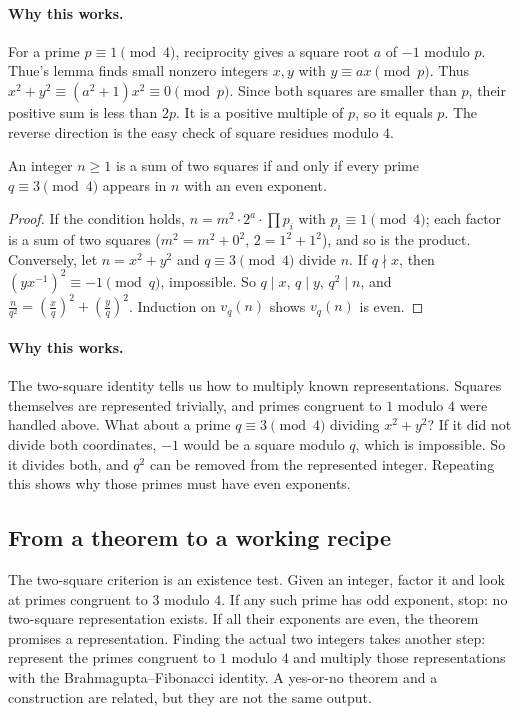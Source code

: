 \paragraph{Why this works.}
For a prime $p\equiv1\pmod4$, reciprocity gives a square root $a$ of $-1$ modulo $p$. Thue's lemma finds small nonzero integers $x,y$ with $y\equiv ax\pmod p$. Thus $x^2+y^2\equiv(a^2+1)x^2\equiv0\pmod p$. Since both squares are smaller than $p$, their positive sum is less than $2p$. It is a positive multiple of $p$, so it equals $p$. The reverse direction is the easy check of square residues modulo $4$.

\begin{theorem}\label{thm:twosqn}
An integer $n\ge1$ is a sum of two squares if and only if every prime $q\equiv3\pmod4$ appears in $n$ with an even exponent.
\end{theorem}
\begin{proof}
If the condition holds, $n=m^2\cdot2^a\cdot\prod p_i$ with $p_i\equiv1\pmod4$; each factor is a sum of two squares ($m^2=m^2+0^2$, $2=1^2+1^2$), and so is the product. Conversely, let $n=x^2+y^2$ and $q\equiv3\pmod4$ divide $n$. If $q\nmid x$, then $\left(yx^{-1}\right)^2\equiv-1\pmod q$, impossible. So $q\mid x$, $q\mid y$, $q^2\mid n$, and $\frac n{q^2}=\left(\frac xq\right)^2+\left(\frac yq\right)^2$. Induction on $v_q(n)$ shows $v_q(n)$ is even.
\end{proof}

\paragraph{Why this works.}
The two-square identity tells us how to multiply known representations. Squares themselves are represented trivially, and primes congruent to $1$ modulo $4$ were handled above. What about a prime $q\equiv3\pmod4$ dividing $x^2+y^2$? If it did not divide both coordinates, $-1$ would be a square modulo $q$, which is impossible. So it divides both, and $q^2$ can be removed from the represented integer. Repeating this shows why those primes must have even exponents.

\subsection*{From a theorem to a working recipe}
The two-square criterion is an existence test. Given an integer, factor it and look at primes congruent to $3$ modulo $4$. If any such prime has odd exponent, stop: no two-square representation exists. If all their exponents are even, the theorem promises a representation. Finding the actual two integers takes another step: represent the primes congruent to $1$ modulo $4$ and multiply those representations with the Brahmagupta--Fibonacci identity. A yes-or-no theorem and a construction are related, but they are not the same output.


